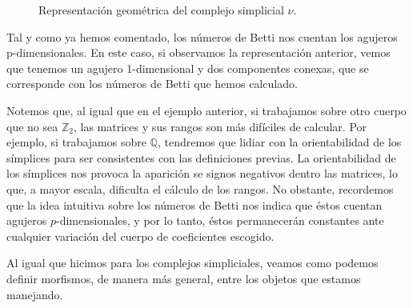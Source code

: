 \documentclass[12pt, a4paper, twoside]{book}
\numberwithin{equation}{section}
\theoremstyle{definition}
\newenvironment{ejem}
  {\pushQED{\qed}\renewcommand{\qedsymbol}{$\blacktriangleleft$}\ejemplo}
  {\popQED\endejemplo}
\theoremstyle{remark}
\theoremstyle{plain}
\begin{document}
\begin{ejem}
\begin{figure}[H]
			\caption{Representación geométrica del complejo simplicial {\Large $\nu$}.}
			\label{fig:homs}
		\end{figure}
		Tal y como ya hemos comentado, los números de Betti nos 
		cuentan los agujeros p-dimensionales. En este caso, si 
		observamos la representación anterior, vemos que tenemos un 
		agujero 1-dimensional y dos componentes conexas, que se 
		corresponde con los números de Betti que hemos calculado. 

		Notemos que, al igual que en el ejemplo anterior, si 
		trabajamos sobre otro cuerpo que no sea $\mathbb{Z}_{2}$, las 
		matrices y sus rangos son más difíciles de calcular. Por 
		ejemplo, si trabajamos sobre $\mathbb{Q}$, tendremos que 
		lidiar con la orientabilidad de los símplices para ser 
		consistentes con las definiciones previas. La orientabilidad 
		de los símplices nos provoca la aparición se signos negativos 
		dentro las matrices, lo que, a mayor escala, dificulta el 
		cálculo de los rangos. No obstante, recordemos que la idea 
		intuitiva sobre los números de Betti nos indica que éstos 
		cuentan agujeros $p$-dimensionales, y por lo tanto, éstos 
		permanecerán constantes ante cualquier variación del 
		cuerpo de coeficientes escogido.  
	\end{ejem}
	
	Al igual que hicimos para los complejos simpliciales, veamos como 
	podemos definir morfismos, de manera más general, entre los objetos 
	que estamos manejando.
	
\end{document}
